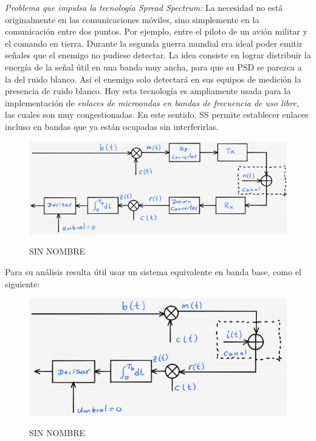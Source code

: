 \textit{Problema que impulsa la tecnología Spread Spectrum:} La necesidad no está originalmente en las comunicaciones móviles, sino simplemente en la comunicación entre dos puntos. Por ejemplo, entre el piloto de un avión militar y el comando en tierra. Durante la segunda guerra mundial era ideal poder emitir señales que el enemigo no pudiese detectar. La idea consiste en lograr distribuir la energía de la señal útil en una banda muy ancha, para que su PSD se parezca a la del ruido blanco. Así el enemigo solo detectará en sus equipos de medición la presencia de ruido blanco. Hoy esta tecnología es ampliamente usada para la implementación de \textit{enlaces de microondas en bandas de frecuencia de uso libre}, las cuales son muy congestionadas. En este sentido, SS permite establecer enlaces incluso en bandas que ya están ocupadas sin interferirlas. \\ 

\vspace{200px}
\begin{figure}[h!]
	\captionsetup{justification = raggedright, singlelinecheck = false}
	\caption{SIN NOMBRE} 
	\centering
	\includegraphics[scale=1]{Imagenes/Diagrama-TX.png}
	\label{fig:Diagrama-TX}
\end{figure}

Para su análisis resulta útil usar un sistema equivalente en banda base, como el siguiente:\\


\begin{figure}[h!]
	\captionsetup{justification = raggedright, singlelinecheck = false}
	\caption{SIN NOMBRE} 
	\centering
	\includegraphics[scale=1]{Imagenes/Diagrama-RX.png}
	\label{fig:Diagrama-RX}
\end{figure}

